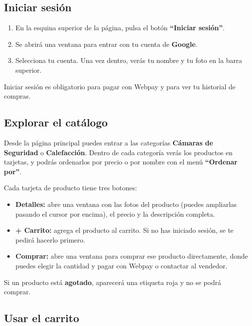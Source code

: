 \documentclass[11pt,a4paper]{article}
\begin{document}
\subsection{Iniciar sesión}

\begin{enumerate}[leftmargin=*]
  \item En la esquina superior de la página, pulsa el botón \textbf{``Iniciar sesión''}.
  \item Se abrirá una ventana para entrar con tu cuenta de \textbf{Google}.
  \item Selecciona tu cuenta. Una vez dentro, verás tu nombre y tu foto en la barra superior.
\end{enumerate}

\begin{nota}
Iniciar sesión es obligatorio para pagar con Webpay y para ver tu historial de compras.
\end{nota}

\subsection{Explorar el catálogo}

Desde la página principal puedes entrar a las categorías \textbf{Cámaras de Seguridad}
o \textbf{Calefacción}. Dentro de cada categoría verás los productos en tarjetas, y podrás
ordenarlos por precio o por nombre con el menú \textbf{``Ordenar por''}.

Cada tarjeta de producto tiene tres botones:
\begin{itemize}[leftmargin=*]
  \item \textbf{Detalles:} abre una ventana con las fotos del producto (puedes ampliarlas
        pasando el cursor por encima), el precio y la descripción completa.
  \item \textbf{+ Carrito:} agrega el producto al carrito. Si no has iniciado sesión, se te
        pedirá hacerlo primero.
  \item \textbf{Comprar:} abre una ventana para comprar ese producto directamente, donde
        puedes elegir la cantidad y pagar con Webpay o contactar al vendedor.
\end{itemize}

\begin{nota}
Si un producto está \textbf{agotado}, aparecerá una etiqueta roja y no se podrá comprar.
\end{nota}

\subsection{Usar el carrito}
\end{document}
